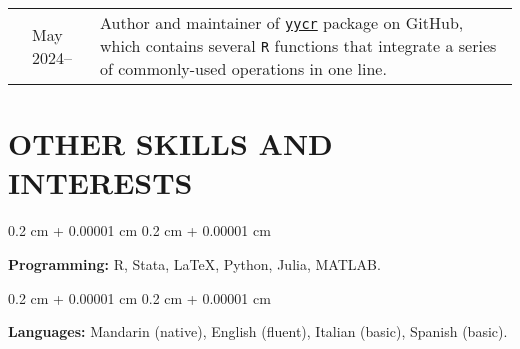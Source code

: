 \documentclass[10pt, letterpaper]{article}
\newenvironment{onecolentry}{
    \begin{adjustwidth}{
        0.2 cm + 0.00001 cm
    }{
        0.2 cm + 0.00001 cm
    }
}{
    \end{adjustwidth}
} %
\newenvironment{paper}{\vspace{.2cm}\begin{samepage}\begin{onecolentry}}{\end{onecolentry}\end{samepage}\vspace{0.2cm}}
\begin{document}
\vspace{.2cm}
\begin{tabularx}{\textwidth}{@{}p{.2cm} @{}p{2cm} X@{}}
	& May 2024-- & Author and maintainer of \href{https://github.com/yang-yuchuan/yycr}{\texttt{yycr}} package on GitHub, which contains several \texttt{R} functions that integrate a series of commonly-used operations in one line.
\end{tabularx}


\section{OTHER SKILLS AND INTERESTS}

\begin{paper}
	\textbf{Programming:} R, Stata, \LaTeX, Python, Julia, MATLAB.
\end{paper}

\begin{paper}
	\textbf{Languages:} Mandarin (native), English (fluent), Italian (basic), Spanish (basic).
\end{paper}
\end{document}
